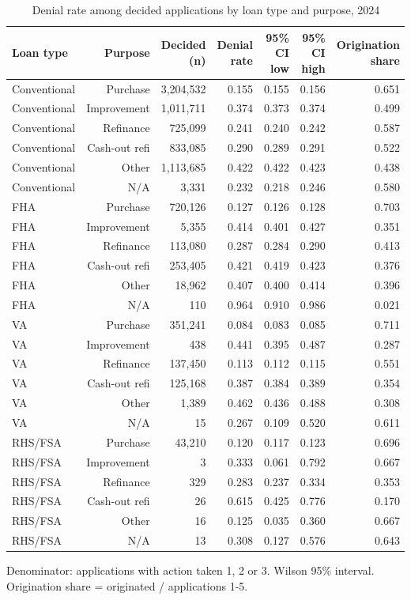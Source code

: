 \begin{table}[t]
\centering
\caption{Denial rate among decided applications by loan type and purpose, 2024}
\label{tab:table2_q1_product_rates}
\small
\begin{tabular}{lrrrrrr}
\toprule
Loan type & Purpose & Decided (n) & Denial rate & 95\% CI low & 95\% CI high & Origination share \\
\midrule
Conventional & Purchase & 3,204,532 & 0.155 & 0.155 & 0.156 & 0.651 \\
Conventional & Improvement & 1,011,711 & 0.374 & 0.373 & 0.374 & 0.499 \\
Conventional & Refinance & 725,099 & 0.241 & 0.240 & 0.242 & 0.587 \\
Conventional & Cash-out refi & 833,085 & 0.290 & 0.289 & 0.291 & 0.522 \\
Conventional & Other & 1,113,685 & 0.422 & 0.422 & 0.423 & 0.438 \\
Conventional & N/A & 3,331 & 0.232 & 0.218 & 0.246 & 0.580 \\
FHA & Purchase & 720,126 & 0.127 & 0.126 & 0.128 & 0.703 \\
FHA & Improvement & 5,355 & 0.414 & 0.401 & 0.427 & 0.351 \\
FHA & Refinance & 113,080 & 0.287 & 0.284 & 0.290 & 0.413 \\
FHA & Cash-out refi & 253,405 & 0.421 & 0.419 & 0.423 & 0.376 \\
FHA & Other & 18,962 & 0.407 & 0.400 & 0.414 & 0.396 \\
FHA & N/A & 110 & 0.964 & 0.910 & 0.986 & 0.021 \\
VA & Purchase & 351,241 & 0.084 & 0.083 & 0.085 & 0.711 \\
VA & Improvement & 438 & 0.441 & 0.395 & 0.487 & 0.287 \\
VA & Refinance & 137,450 & 0.113 & 0.112 & 0.115 & 0.551 \\
VA & Cash-out refi & 125,168 & 0.387 & 0.384 & 0.389 & 0.354 \\
VA & Other & 1,389 & 0.462 & 0.436 & 0.488 & 0.308 \\
VA & N/A & 15 & 0.267 & 0.109 & 0.520 & 0.611 \\
RHS/FSA & Purchase & 43,210 & 0.120 & 0.117 & 0.123 & 0.696 \\
RHS/FSA & Improvement & 3 & 0.333 & 0.061 & 0.792 & 0.667 \\
RHS/FSA & Refinance & 329 & 0.283 & 0.237 & 0.334 & 0.353 \\
RHS/FSA & Cash-out refi & 26 & 0.615 & 0.425 & 0.776 & 0.170 \\
RHS/FSA & Other & 16 & 0.125 & 0.035 & 0.360 & 0.667 \\
RHS/FSA & N/A & 13 & 0.308 & 0.127 & 0.576 & 0.643 \\
\bottomrule
\end{tabular}
\par\footnotesize Denominator: applications with action taken 1, 2 or 3. Wilson 95\% interval. Origination share = originated / applications 1-5.
\end{table}
